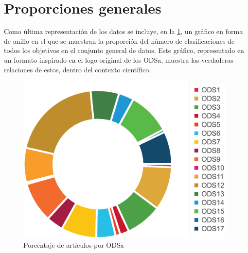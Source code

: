 \section{Proporciones generales}

Como última representación de los datos se incluye, en la \cref{fig:Relaciones generales ODSs}, un gráfico en forma de anillo en el que se muestran la proporción del número de clasificaciones de todos los objetivos en el conjunto general de datos. Este gráfico, representado en un formato inspirado en  el logo original de los \gls{ODSa}, muestra las verdaderas relaciones de estos, dentro del contexto científico.

\begin{figure}[H]
    \centering
    \includegraphics[scale=0.6]{imagenes/resultados_queso.eps}
    \captionsetup{justification=centering}
    \caption{Porcentaje de artículos por ODSa}
    \label{fig:Relaciones generales ODSs}
\end{figure}

